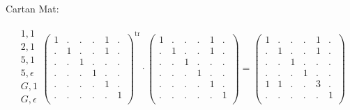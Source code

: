 \documentclass[12pt,a4paper]{amsart}
\begin{document}

\newpage
\normalsize {}
Cartan Mat:

\begin{align*}
  \begin{array}{r}
    1,1 \\ \hline
    2,1 \\ \hline
    5,1 \\
    5,\epsilon \\ \hline
    G,1 \\
    G,\epsilon \\
  \end{array}
  \left(
  \begin{array}{c|c|cc|cc}
    1&.&.&.&1&.\\\hline
    .&1&.&.&1&.\\\hline
    .&.&1&.&.&.\\
    .&.&.&1&.&.\\\hline
    .&.&.&.&1&.\\
    .&.&.&.&.&1\\
  \end{array}
\right)^{\mathrm{tr}}
\cdot
  \left(
  \begin{array}{c|c|cc|cc}
    1&.&.&.&1&.\\\hline
    .&1&.&.&1&.\\\hline
    .&.&1&.&.&.\\
    .&.&.&1&.&.\\\hline
    .&.&.&.&1&.\\
    .&.&.&.&.&1\\
  \end{array}
\right)
=
  \left(
  \begin{array}{c|c|cc|cc}
    1&.&.&.&1&.\\\hline
    .&1&.&.&1&.\\\hline
    .&.&1&.&.&.\\
    .&.&.&1&.&.\\\hline
    1&1&.&.&3&.\\
    .&.&.&.&.&1\\
  \end{array}
\right)
\end{align*}
\end{document}
